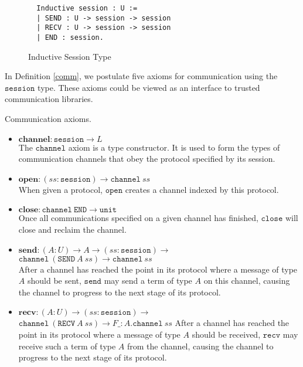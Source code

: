 \documentclass[sigplan,screen,review,anonymous]{acmart}
\newcommand{\unit}{\texttt{unit}}
\newcommand{\session}{\texttt{session}}
\newcommand{\channel}{\texttt{channel}}
\newcommand{\open}{\texttt{open}}
\newcommand{\close}{\texttt{close}}
\newcommand{\send}{\texttt{send}}
\newcommand{\recv}{\texttt{recv}}
\newcommand{\SEND}{\texttt{SEND}}
\newcommand{\RECV}{\texttt{RECV}}
\newcommand{\END}{\texttt{END}}
\begin{document}
\begin{figure}[h]
  \caption{Inductive Session Type}
  \begin{verbatim}
  Inductive session : U :=
  | SEND : U -> session -> session
  | RECV : U -> session -> session
  | END : session.
  \end{verbatim}
  \label{session}
  \Description{}
\end{figure}

In Definition \ref{comm}, we postulate five axioms for communication using the $\session$ type. These axioms could be viewed as an interface to trusted communication libraries.

\begin{definition}
  Communication axioms.
  \begin{itemize}
    \item $\textbf{channel} : \session \rightarrow L$ \\
          The $\channel$ axiom is a type constructor. It is used to form the types of communication channels that obey the protocol specified by its session.
    \item $\textbf{open} : (ss : \session) \rightarrow \channel\ ss$ \\
          When given a protocol, $\open$ creates a channel indexed by this protocol.
    \item $\textbf{close} : \channel\ \END \rightarrow \unit$ \\
          Once all communications specified on a given channel has finished, $\close$ will close and reclaim the channel.
    \item $\textbf{send} : (A : U) \rightarrow A \rightarrow (ss : \session) \rightarrow$ \\
          \phantom{send : (A :)}
          $\channel\ (\SEND\ A\ ss) \rightarrow \channel\ ss$ \\
          After a channel has reached the point in its protocol where a message of type $A$ should be sent, $\send$ may send a term of type $A$ on this channel, causing the channel to progress to the next stage of its protocol.
    \item $\textbf{recv} : (A : U) \rightarrow (ss : \session) \rightarrow $ \\
          \phantom{recv : (A :)}
          $\channel\ (\RECV\ A\ ss) \rightarrow F \_:A.\channel\ ss$
          After a channel has reached the point in its protocol where a message of type $A$ should be received, $\recv$ may receive such a term of type $A$ from the channel, causing the channel to progress to the next stage of its protocol.
  \end{itemize}
  \label{comm}
\end{definition}
\end{document}

